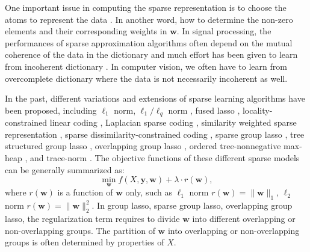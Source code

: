 \documentclass[journal]{IEEEtran}
\begin{document}
      One important issue in computing the sparse representation is to choose the atoms   to represent the data \cite{Wright10}. In another word, how to determine the non-zero elements and their corresponding weights in $\textbf{w}$. In signal processing,  the performances of sparse approximation algorithms often depend  on the mutual coherence of the data in the dictionary and much effort has been given to learn from incoherent dictionary  \cite{6451295}. 
    In computer vision, we often have to learn from overcomplete   dictionary  where the data is  not necessarily incoherent as well. %
  
  In the past, different variations and extensions of sparse learning  algorithms have been proposed, including $\ell_1$ norm, $\ell_1/\ell_q$ norm \cite{Argyriou2008},   fused lasso \cite{Tibshirani2005}, locality-constrained linear coding \cite{llc2010}, Laplacian sparse coding \cite{gao2010}, similarity weighted sparse representation \cite{guo2012}, sparse dissimilarity-constrained coding \cite{CJ15}, sparse group lasso \cite{sparsegrouplasso2010}, tree structured group lasso \cite{Jacob2009}, overlapping group lasso \cite{vijver2002}, ordered tree-nonnegative max-heap \cite{Zhao_thecomposite}, and trace-norm \cite{945730}.   
  The objective functions of these different sparse models can be  generally summarized as:
  \begin{equation}
     \min_\textbf{w} f(X, \textbf{y}, \textbf{w})+ \lambda \cdot r(\textbf{w}),  \label{eq4}
  \end{equation}
     where  $r(\textbf{w})$ is a function of $\textbf{w}$ only, such as $\ell_1$ norm $r(\textbf{w})=\|\textbf{w}\|_1$, $\ell_2$ norm $r(\textbf{w})=\|\textbf{w}\|_2^2$. In group lasso,  sparse group lasso, overlapping group lasso, the regularization term requires to divide $\textbf{w}$ into different overlapping or non-overlapping groups. The partition of   $\textbf{w}$ into overlapping or non-overlapping groups is often determined by properties of $X$.
     
\end{document}
